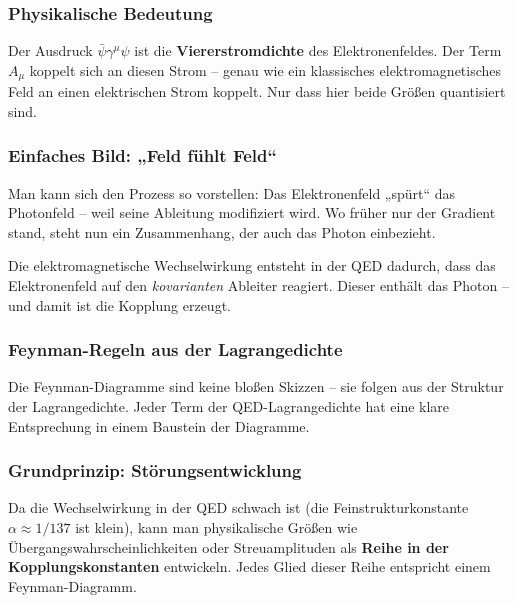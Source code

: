 \subsubsection*{Physikalische Bedeutung}
Der Ausdruck $\bar{\psi} \gamma^\mu \psi$ ist die \textbf{Viererstromdichte} des Elektronenfeldes. Der Term $A_\mu$ koppelt sich an diesen Strom – genau wie ein klassisches elektromagnetisches Feld an einen elektrischen Strom koppelt. Nur dass hier beide Größen quantisiert sind.

\subsubsection*{Einfaches Bild: „Feld fühlt Feld“}
Man kann sich den Prozess so vorstellen: Das Elektronenfeld „spürt“ das Photonfeld – weil seine Ableitung modifiziert wird. Wo früher nur der Gradient stand, steht nun ein Zusammenhang, der auch das Photon einbezieht.

\vspace{1em}
\begin{tcolorbox}[didaktikbox, title=Die Kraft entsteht aus dem Ableiter]
	\label{box:Die Kraft entsteht aus dem Ableiter}
	Die elektromagnetische Wechselwirkung entsteht in der QED dadurch, dass das Elektronenfeld auf den \emph{kovarianten} Ableiter reagiert. Dieser enthält das Photon – und damit ist die Kopplung erzeugt.
\end{tcolorbox}

\subsubsection{Feynman-Regeln aus der Lagrangedichte}

Die Feynman-Diagramme sind keine bloßen Skizzen – sie folgen aus der Struktur der Lagrangedichte. Jeder Term der QED-Lagrangedichte hat eine klare Entsprechung in einem Baustein der Diagramme.

\subsubsection*{Grundprinzip: Störungsentwicklung}
Da die Wechselwirkung in der QED schwach ist (die Feinstrukturkonstante $\alpha \approx 1/137$ ist klein), kann man physikalische Größen wie Übergangswahrscheinlichkeiten oder Streuamplituden als \textbf{Reihe in der Kopplungskonstanten} entwickeln. Jedes Glied dieser Reihe entspricht einem Feynman-Diagramm.

